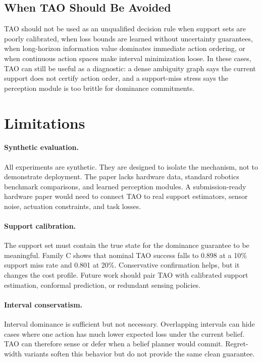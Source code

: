 \documentclass{article}
\begin{document}
\subsection{When TAO Should Be Avoided}

TAO should not be used as an unqualified decision rule when support sets are poorly calibrated, when loss bounds are learned without uncertainty guarantees, when long-horizon information value dominates immediate action ordering, or when continuous action spaces make interval minimization loose. In these cases, TAO can still be useful as a diagnostic: a dense ambiguity graph says the current support does not certify action order, and a support-miss stress says the perception module is too brittle for dominance commitments.

\section{Limitations}

\paragraph{Synthetic evaluation.}
All experiments are synthetic. They are designed to isolate the mechanism, not to demonstrate deployment. The paper lacks hardware data, standard robotics benchmark comparisons, and learned perception modules. A submission-ready hardware paper would need to connect TAO to real support estimators, sensor noise, actuation constraints, and task losses.

\paragraph{Support calibration.}
The support set must contain the true state for the dominance guarantee to be meaningful. Family C shows that nominal TAO success falls to 0.898 at a 10\% support miss rate and 0.801 at 20\%. Conservative confirmation helps, but it changes the cost profile. Future work should pair TAO with calibrated support estimation, conformal prediction, or redundant sensing policies.

\paragraph{Interval conservatism.}
Interval dominance is sufficient but not necessary. Overlapping intervals can hide cases where one action has much lower expected loss under the current belief. TAO can therefore sense or defer when a belief planner would commit. Regret-width variants soften this behavior but do not provide the same clean guarantee.
\end{document}

